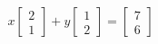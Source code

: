\documentclass[preview]{standalone}
\begin{document}
\begin{align*}
x \begin{bmatrix} 2 \\ 1 \end{bmatrix} + y \begin{bmatrix} 1 \\ 2 \end{bmatrix} = \begin{bmatrix} 7 \\ 6 \end{bmatrix}
\end{align*}
\end{document}

